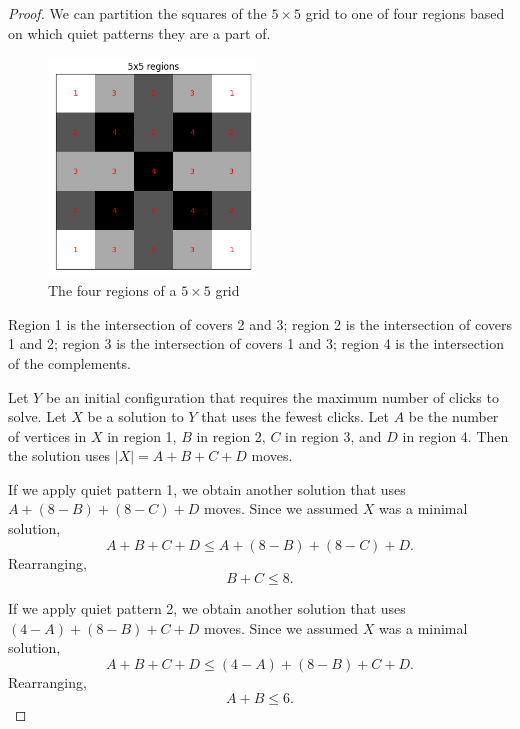 \documentclass[a4paper]{article}
\newcommand{\abs}[1]{\left| #1 \right|}
\begin{document}
\begin{proof}
		We can partition the squares of the $5 \times 5$ grid to one of four regions based on which quiet patterns they are a part of.
		
		\begin{figure}[H]
			\centering
			\includegraphics[width=0.49\textwidth]{../../code/serialization/regions/5x5_regions.png}
			\caption{The four regions of a $5 \times 5$ grid}
		\end{figure}
	
		Region 1 is the intersection of covers 2 and 3; region 2 is the intersection of  covers 1 and 2; region 3 is the intersection of covers 1 and 3;
		region 4 is the intersection of the complements.
		
		Let $Y$ be an initial configuration that requires the maximum number of clicks to solve.
		Let $X$ be a solution to $Y$ that uses the fewest clicks.
		Let $A$ be the number of vertices in $X$ in region 1, $B$ in region 2, $C$ in region 3, and $D$ in region 4.
		Then the solution uses $\abs{X} = A + B + C + D$ moves.
		
		If we apply quiet pattern 1, we obtain another solution that uses $A + (8 - B) + (8 - C) + D$ moves.
		Since we assumed $X$ was a minimal solution,
		\begin{equation*}
			A + B + C + D \leq A + (8 - B) + (8 - C) + D.
		\end{equation*}
		Rearranging,
		\begin{equation}\label{5x5_constr1}
			B + C \leq 8.
		\end{equation}
	
		If we apply quiet pattern 2, we obtain another solution that uses $(4 - A) + (8 - B) + C + D$ moves.
		Since we assumed $X$ was a minimal solution,
		\begin{equation*}
			A + B + C + D \leq (4 - A) + (8 - B) + C + D.
		\end{equation*}
		Rearranging,
		\begin{equation}\label{5x5_constr2}
			A + B \leq 6.
		\end{equation}
	

\end{proof}
\end{document}
